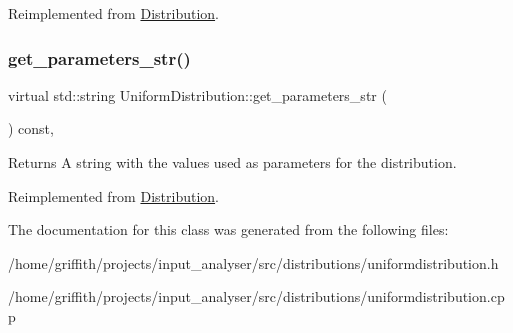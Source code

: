 Reimplemented from \hyperlink{classDistribution_a478a0c7b72d3ad266a2b6f1b9ed20fe9}{Distribution}.

\mbox{\label{classUniformDistribution_a9e276cfa4ff3021a0e4b1b4edd8a1c67}} 
\subsubsection{\texorpdfstring{get\+\_\+parameters\+\_\+str()}{get\_parameters\_str()}}
{\footnotesize\ttfamily virtual std\+::string Uniform\+Distribution\+::get\+\_\+parameters\+\_\+str (\begin{DoxyParamCaption}{ }\end{DoxyParamCaption}) const\hspace{0.3cm}{\ttfamily [inline]}, {\ttfamily [virtual]}}

\begin{DoxyReturn}{Returns}
A string with the values used as parameters for the distribution. 
\end{DoxyReturn}


Reimplemented from \hyperlink{classDistribution_a716b7df9facb6bb016f46ac130297f9c}{Distribution}.



The documentation for this class was generated from the following files\+:\begin{DoxyCompactItemize}
\item 
/home/griffith/projects/input\+\_\+analyser/src/distributions/uniformdistribution.\+h\item 
/home/griffith/projects/input\+\_\+analyser/src/distributions/uniformdistribution.\+cpp\end{DoxyCompactItemize}
